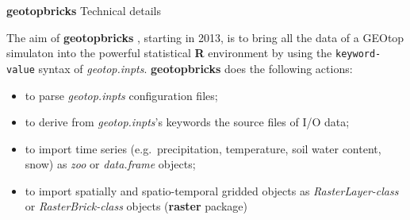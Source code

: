 \documentclass[ignorenonframetext,]{beamer}
\providecommand{\tightlist}{%
  \setlength{\itemsep}{0pt}\setlength{\parskip}{0pt}}
\begin{document}
\begin{frame}[fragile]{\textbf{geotopbricks} Technical details}

The aim of \textbf{geotopbricks} , starting in 2013, is to bring all the
data of a GEOtop simulaton into the powerful statistical \textbf{R}
environment by using the \texttt{keyword-value} syntax of
\emph{geotop.inpts}. \textbf{geotopbricks} does the following actions:

\begin{itemize}
\tightlist
\item
  to parse \emph{geotop.inpts} configuration files;
\item
  to derive from \emph{geotop.inpts}'s keywords the source files of I/O
  data;
\item
  to import time series (e.g.~precipitation, temperature, soil water
  content, snow) as \emph{zoo} or \emph{data.frame} objects;
\item
  to import spatially and spatio-temporal gridded objects as
  \emph{RasterLayer-class} or \emph{RasterBrick-class} objects
  (\textbf{raster} package)
\end{itemize}

\end{frame}
\end{document}

